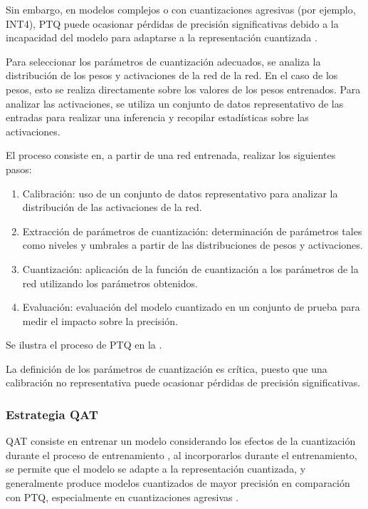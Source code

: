 Sin embargo, en modelos complejos o con cuantizaciones agresivas (por ejemplo, INT4), PTQ puede ocasionar pérdidas de precisión significativas debido a la incapacidad del modelo para adaptarse a la representación cuantizada \cite{dai2024trainablefixedpointquantizationdeep}.

Para seleccionar los parámetros de cuantización adecuados, se analiza la distribución de los pesos y activaciones de la red de la red. En el caso de los pesos, esto se realiza directamente sobre los valores de los pesos entrenados. Para analizar las activaciones, se utiliza un conjunto de datos representativo de las entradas para realizar una inferencia y recopilar estadísticas sobre las activaciones.

El proceso consiste en, a partir de una red entrenada, realizar los siguientes pasos:

\begin{enumerate}
    \item Calibración: uso de un conjunto de datos representativo para analizar la distribución de las activaciones de la red.
    \item Extracción de parámetros de cuantización: determinación de parámetros tales como niveles y umbrales a partir de las distribuciones de pesos y activaciones.
    \item Cuantización: aplicación de la función de cuantización a los parámetros de la red utilizando los parámetros obtenidos.
    \item Evaluación: evaluación del modelo cuantizado en un conjunto de prueba para medir el impacto sobre la precisión.
\end{enumerate}

Se ilustra el proceso de PTQ en la .


La definición de los parámetros de cuantización es crítica, puesto que una calibración no representativa puede ocasionar pérdidas de precisión significativas.

\subsubsection{Estrategia QAT}
\label{sec:qat}
QAT consiste en entrenar un modelo considerando los efectos de la cuantización durante el proceso de entrenamiento \cite{jacob2017quantizationtrainingneuralnetworks}, al incorporarlos durante el entrenamiento, se permite que el modelo se adapte a la representación cuantizada, y generalmente produce modelos cuantizados de mayor precisión en comparación con PTQ, especialmente en cuantizaciones agresivas \cite{dai2024trainablefixedpointquantizationdeep}.

